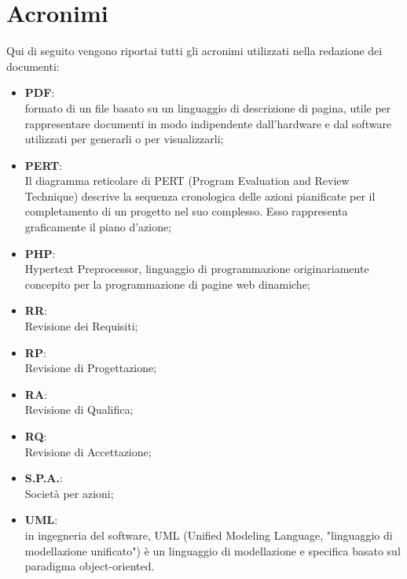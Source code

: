 \section{Acronimi}
Qui di seguito vengono riportai tutti gli acronimi utilizzati nella redazione dei documenti:
\begin{itemize}
\item \textbf{PDF}:\\ formato di un file basato su un linguaggio di descrizione di pagina, utile per rappresentare documenti in modo indipendente dall'hardware e dal software utilizzati per generarli o per visualizzarli;
\item \textbf{PERT}:\\ Il diagramma reticolare di PERT (Program Evaluation and Review Technique) descrive la sequenza cronologica delle azioni pianificate per il completamento di un progetto nel suo complesso. Esso rappresenta graficamente il piano d’azione;
\item \textbf{PHP}:\\ Hypertext Preprocessor, linguaggio di programmazione originariamente concepito per la programmazione di pagine web dinamiche;
\item \textbf{RR}:\\ Revisione dei Requisiti;
\item \textbf{RP}:\\ Revisione di Progettazione;
\item \textbf{RA}:\\ Revisione di Qualifica;
\item \textbf{RQ}:\\ Revisione di Accettazione;
\item \textbf{S.P.A.}:\\ Società per azioni;
\item \textbf{UML}:\\ in ingegneria del software, UML (Unified Modeling Language, "linguaggio di modellazione unificato") è un linguaggio di modellazione e specifica basato sul paradigma object-oriented.
\end{itemize}